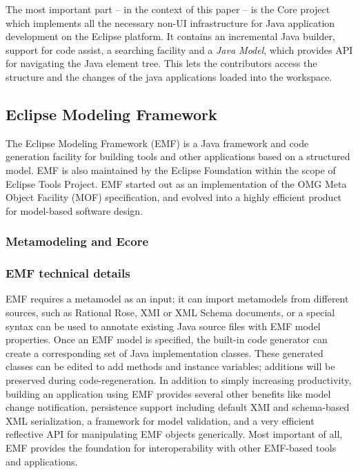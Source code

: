 The most important part -- in the context of this paper -- is the Core project
which implements all the necessary non-UI infrastructure for Java application
development on the Eclipse platform. It contains an incremental Java builder,
support for code assist, a searching facility and a \emph{Java Model}, which
provides API for navigating the Java element tree. This lets the contributors
access the structure and the changes of the java applications loaded into the
workspace.

\subsection{Eclipse Modeling Framework}
The Eclipse Modeling Framework (EMF) \cite{EMF} is a Java framework and code
generation facility for building tools and other applications based on a
structured model. EMF is also maintained by the Eclipse Foundation within the
scope of Eclipse Tools Project. EMF started out as an implementation of the OMG
Meta Object Facility (MOF) specification, and evolved into a highly efficient
product for model-based software design.

\subsubsection{Metamodeling and Ecore}

\subsubsection{EMF technical details}
EMF requires a metamodel as an input; it can import metamodels from different
sources, such as Rational Rose, XMI or XML Schema documents, or a special syntax
can be used to annotate existing Java source files with EMF model properties.
Once an EMF model is specified, the built-in code generator can create a
corresponding set of Java implementation classes.
These generated classes can be edited to add methods and instance variables;
additions will be preserved during code-regeneration. In addition to simply
increasing productivity, building an application using EMF provides several
other benefits like model change notification, persistence support including
default XMI and schema-based XML serialization, a framework for model
validation, and a very efficient reflective API for manipulating EMF objects
generically. Most important of all, EMF provides the foundation for
interoperability with other EMF-based tools and applications.

